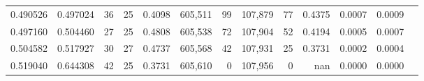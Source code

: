 \begin{tabular}{rrrrrrrrrrrrr}
0.490526 & 0.497024 &  36 &  25 &                                     0.4098 & 605,511 &      99 & 107,879 &      77 & 0.4375 & 0.0007 & 0.0009 \\
0.497160 & 0.504460 &  27 &  25 &                                     0.4808 & 605,538 &      72 & 107,904 &      52 & 0.4194 & 0.0005 & 0.0007 \\
0.504582 & 0.517927 &  30 &  27 &                                     0.4737 & 605,568 &      42 & 107,931 &      25 & 0.3731 & 0.0002 & 0.0004 \\
0.519040 & 0.644308 &  42 &  25 &                                     0.3731 & 605,610 &       0 & 107,956 &       0 &    nan & 0.0000 & 0.0000 \\
\bottomrule
\end{tabular}
